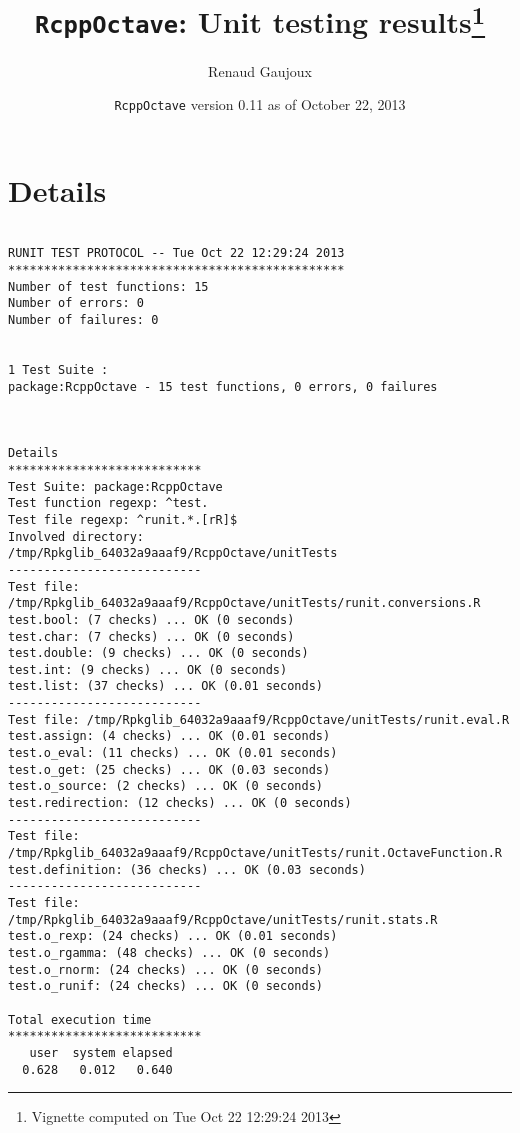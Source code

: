 \documentclass[10pt]{article}\usepackage[]{graphicx}\usepackage[]{color}
\author{Renaud Gaujoux}
\title{\texttt{RcppOctave}: Unit testing results\footnote{Vignette computed  on Tue Oct 22 12:29:24 2013}}
\date{\texttt{RcppOctave} version 0.11 as of October 22, 2013}
\begin{document}
\maketitle

\section{Details}
\begin{verbatim}

RUNIT TEST PROTOCOL -- Tue Oct 22 12:29:24 2013 
*********************************************** 
Number of test functions: 15 
Number of errors: 0 
Number of failures: 0 

 
1 Test Suite : 
package:RcppOctave - 15 test functions, 0 errors, 0 failures



Details 
*************************** 
Test Suite: package:RcppOctave 
Test function regexp: ^test. 
Test file regexp: ^runit.*.[rR]$ 
Involved directory: 
/tmp/Rpkglib_64032a9aaaf9/RcppOctave/unitTests 
--------------------------- 
Test file: /tmp/Rpkglib_64032a9aaaf9/RcppOctave/unitTests/runit.conversions.R 
test.bool: (7 checks) ... OK (0 seconds)
test.char: (7 checks) ... OK (0 seconds)
test.double: (9 checks) ... OK (0 seconds)
test.int: (9 checks) ... OK (0 seconds)
test.list: (37 checks) ... OK (0.01 seconds)
--------------------------- 
Test file: /tmp/Rpkglib_64032a9aaaf9/RcppOctave/unitTests/runit.eval.R 
test.assign: (4 checks) ... OK (0.01 seconds)
test.o_eval: (11 checks) ... OK (0.01 seconds)
test.o_get: (25 checks) ... OK (0.03 seconds)
test.o_source: (2 checks) ... OK (0 seconds)
test.redirection: (12 checks) ... OK (0 seconds)
--------------------------- 
Test file: /tmp/Rpkglib_64032a9aaaf9/RcppOctave/unitTests/runit.OctaveFunction.R 
test.definition: (36 checks) ... OK (0.03 seconds)
--------------------------- 
Test file: /tmp/Rpkglib_64032a9aaaf9/RcppOctave/unitTests/runit.stats.R 
test.o_rexp: (24 checks) ... OK (0.01 seconds)
test.o_rgamma: (48 checks) ... OK (0 seconds)
test.o_rnorm: (24 checks) ... OK (0 seconds)
test.o_runif: (24 checks) ... OK (0 seconds)

Total execution time
***************************
   user  system elapsed 
  0.628   0.012   0.640 

\end{verbatim}
\end{document}
